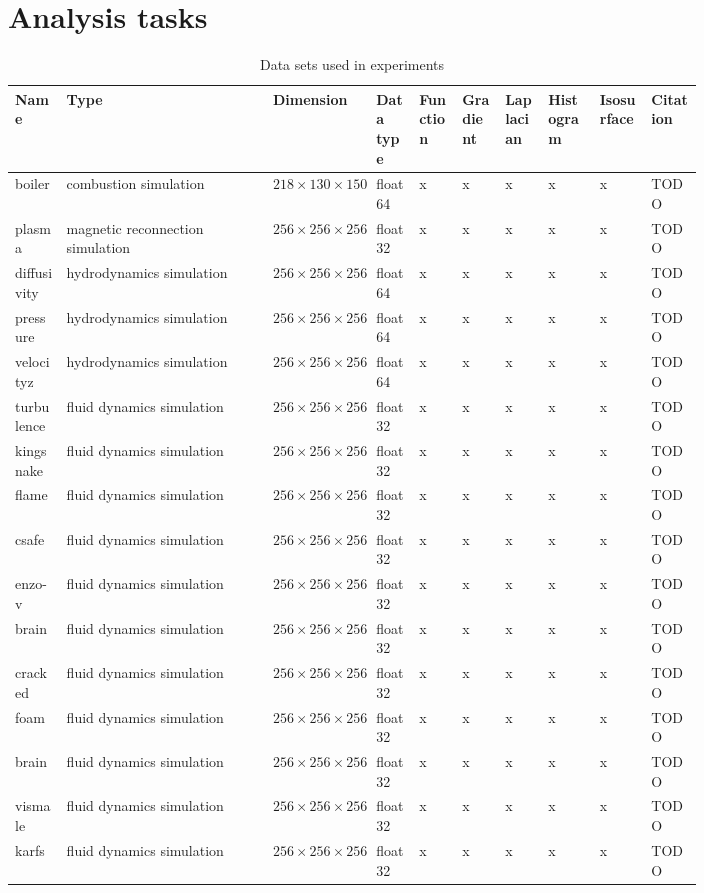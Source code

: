 \section{Analysis tasks}\label{sec:analysis-tasks}

\begin{table*}[t]
  \caption{Data sets used in experiments }
  \centering
  \begin{tabular}{p{0.06\linewidth}p{0.24\linewidth}p{0.12\linewidth}p{0.05\linewidth}p{0.05\linewidth}p{0.05\linewidth}p{0.05\linewidth}p{0.06\linewidth}p{0.06\linewidth}p{0.06\linewidth}}
  \hline
  Name & Type & Dimension & Data type & Function & Gradient & Laplacian & Histogram & Isosurface & Citation\\
  \hline
  boiler & combustion simulation& $218\times 130 \times 150$ & float64 & x & x & x & x & x & TODO \\
  plasma & magnetic reconnection simulation& $256\times 256 \times 256$ & float32 & x & x & x & x & x & TODO\\
  diffusivity & hydrodynamics simulation& $256\times 256\times 256$ & float64 & x & x & x & x & x & TODO\\
  pressure & hydrodynamics simulation& $256\times 256 \times 256$ & float64 & x & x & x & x & x & TODO\\
  velocityz & hydrodynamics simulation& $256\times 256\times 256$ & float64 & x & x & x & x & x & TODO\\
	turbulence & fluid dynamics simulation& $256\times 256 \times 256$ & float32 & x & x & x & x & x & TODO\\
	kingsnake & fluid dynamics simulation& $256\times 256 \times 256$ & float32 & x & x & x & x & x & TODO\\
	flame & fluid dynamics simulation& $256\times 256 \times 256$ & float32 & x & x & x & x & x & TODO\\
	csafe & fluid dynamics simulation& $256\times 256 \times 256$ & float32 & x & x & x & x & x & TODO\\
	enzo-v & fluid dynamics simulation& $256\times 256 \times 256$ & float32 & x & x & x & x & x & TODO\\
	brain & fluid dynamics simulation& $256\times 256 \times 256$ & float32 & x & x & x & x & x & TODO\\
	cracked & fluid dynamics simulation& $256\times 256 \times 256$ & float32 & x & x & x & x & x & TODO\\
	foam & fluid dynamics simulation& $256\times 256 \times 256$ & float32 & x & x & x & x & x & TODO\\
	brain & fluid dynamics simulation& $256\times 256 \times 256$ & float32 & x & x & x & x & x & TODO\\
	vismale & fluid dynamics simulation& $256\times 256 \times 256$ & float32 & x & x & x & x & x & TODO\\
	karfs	& fluid dynamics simulation& $256\times 256 \times 256$ & float32 & x & x & x & x & x & TODO\\
  \hline
  \end{tabular}\label{tbl:data-sets}
\end{table*}

